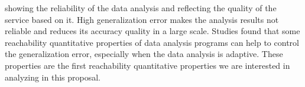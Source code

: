{showing the reliability of the data analysis and reflecting the quality of the service based on it.
High generalization error makes the analysis results
not reliable and reduces its accuracy quality in a large scale.
Studies found that some reachability quantitative properties of data analysis programs can help to control the generalization error, especially when the data analysis is adaptive.
These properties are the first reachability quantitative properties we are interested in
analyzing in this proposal.
}

